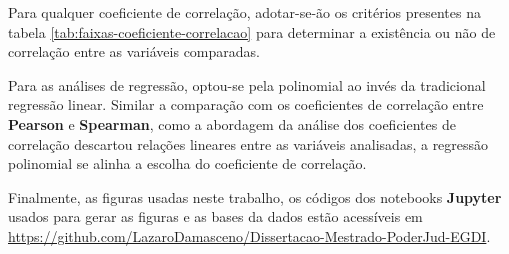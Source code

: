 Para qualquer coeficiente de correlação, adotar-se-ão os critérios presentes na tabela \ref{tab:faixas-coeficiente-correlacao} para determinar a existência ou não de correlação entre as variáveis comparadas.

Para as análises de regressão, optou-se pela polinomial ao invés da tradicional regressão linear. Similar a comparação com os coeficientes de correlação entre \textbf{Pearson} e \textbf{Spearman}, como a abordagem da análise dos coeficientes de correlação descartou relações lineares entre as variáveis analisadas, a regressão polinomial se alinha a escolha do coeficiente de correlação.

Finalmente, as figuras usadas neste trabalho, os códigos dos notebooks \textbf{Jupyter} usados para gerar as figuras e as bases da dados estão acessíveis em \url{https://github.com/LazaroDamasceno/Dissertacao-Mestrado-PoderJud-EGDI}.